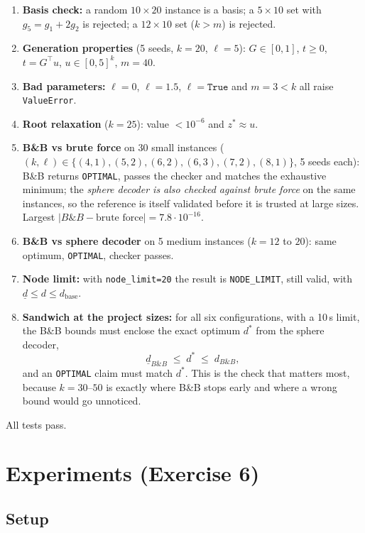 \documentclass[11pt,a4paper]{article}
\newcommand{\BB}{B\&B}
\begin{document}
\begin{enumerate}
  \item \textbf{Basis check:} a random $10\times20$ instance is a basis; a $5\times10$ set with $g_5=g_1+2g_2$ is rejected; a $12\times10$ set ($k>m$) is rejected.
  \item \textbf{Generation properties} (5 seeds, $k=20$, $\ell=5$): $G\in[0,1]$, $t\ge0$, $t=G^\top u$, $u\in[0,5]^k$, $m=40$.
  \item \textbf{Bad parameters:} $\ell=0$, $\ell=1.5$, $\ell=\texttt{True}$ and $m=3<k$ all raise \texttt{ValueError}.
  \item \textbf{Root relaxation} ($k=25$): value $<10^{-6}$ and $z^\ast\approx u$.
  \item \textbf{\BB{} vs brute force} on 30 small instances ($(k,\ell)\in\{(4,1),(5,2),(6,2),(6,3),(7,2),(8,1)\}$, 5 seeds each): \BB{} returns \texttt{OPTIMAL}, passes the checker and matches the exhaustive minimum; the \emph{sphere decoder is also checked against brute force} on the same instances, so the reference is itself validated before it is trusted at large sizes. Largest $|\BB{}-\text{brute force}|=7.8\cdot10^{-16}$.
  \item \textbf{\BB{} vs sphere decoder} on 5 medium instances ($k=12$ to $20$): same optimum, \texttt{OPTIMAL}, checker passes.
  \item \textbf{Node limit:} with \texttt{node\_limit=20} the result is \texttt{NODE\_LIMIT}, still valid, with $\underline d\le d\le d_{\text{base}}$.
  \item \textbf{Sandwich at the project sizes:} for all six configurations, with a 10\,s limit, the \BB{} bounds must enclose the exact optimum $d^\ast$ from the sphere decoder,
  \[
    \underline d_{\BB{}}\;\le\;d^\ast\;\le\;d_{\BB{}},
  \]
  and an \texttt{OPTIMAL} claim must match $d^\ast$. This is the check that matters most, because $k=30$--$50$ is exactly where \BB{} stops early and where a wrong bound would go unnoticed.
\end{enumerate}
All tests pass.

\section{Experiments (Exercise 6)}

\subsection{Setup}
\end{document}

